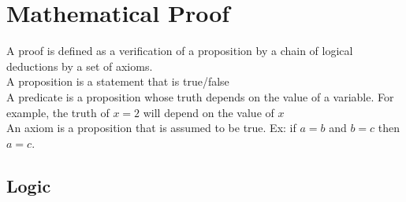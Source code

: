 \documentclass[11pt, fleqn]{article}
\begin{document}
\section{Mathematical Proof}
A proof is defined as a verification of a proposition by a chain of logical deductions by a set of axioms.\\
A proposition is a statement that is true/false\\
A predicate is a proposition whose truth depends on the value of a variable. For example, the truth of $x=2$ will depend on the value of $x$\\
An axiom is a proposition that is assumed to be true. Ex: if $a=b$ and $b=c$ then $a=c$.\\

\subsection{Logic}
\end{document}
